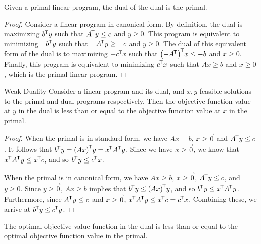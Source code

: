 \newpage

\begin{prop}
    Given a primal linear program, the dual of the dual is the primal.
\end{prop} 

\begin{proof}
    Consider a linear program in canonical form.  By definition, the dual is maximizing ${b}^{\mkern-1.5mu\mathsf{T}}y$ such that ${A}^{\mkern-1.5mu\mathsf{T}}y \leq c$ and $y \geq 0$. This program is equivalent to minimizing $-{b}^{\mkern-1.5mu\mathsf{T}}y$ such that $-{A}^{\mkern-1.5mu\mathsf{T}}y \geq -c$ and $y \geq 0$. The dual of this equivalent form of the dual is to maximizing $-{c}^{\mkern-1.5mu\mathsf{T}}x$ such that ${\left(-{A}^{\mkern-1.5mu\mathsf{T}}\right)}^{\mkern-1.5mu\mathsf{T}}x \leq -b$ and $x \geq 0$. Finally, this program is equivalent to minimizing ${c}^{\mkern-1.5mu\mathsf{T}}x$ such that $Ax \geq b$ and $x \geq 0$, which is the primal linear program.
\end{proof}

\begin{thm}{Weak Duality}\label{weak-duality}\proofbreak
    Consider a linear program and its dual, and $x, y$ feasible solutions to the primal and dual programs respectively. Then the objective function value at $y$ in the dual is less than or equal to the objective function value at $x$ in the primal.
\end{thm}

\begin{proof}
    When the primal is in standard form, we have $Ax = b$, $x \geq \vec{0}$ and ${A}^{\mkern-1.5mu\mathsf{T}}y \leq c$. It follows that ${b}^{\mkern-1.5mu\mathsf{T}}y = {(Ax)}^{\mkern-1.5mu\mathsf{T}}y = {x}^{\mkern-1.5mu\mathsf{T}}{A}^{\mkern-1.5mu\mathsf{T}}y$. Since we have $x \geq \vec{0}$, we know that ${x}^{\mkern-1.5mu\mathsf{T}}{A}^{\mkern-1.5mu\mathsf{T}}y \leq {x}^{\mkern-1.5mu\mathsf{T}}c$, and so ${b}^{\mkern-1.5mu\mathsf{T}}y \leq {c}^{\mkern-1.5mu\mathsf{T}}x$.

    When the primal is in canonical form, we have $Ax \geq b$, $x \geq \vec{0}$, ${A}^{\mkern-1.5mu\mathsf{T}}y \leq c$, and $y \geq 0$. Since $y \geq \vec{0}$, $Ax \geq b$ implies that ${b}^{\mkern-1.5mu\mathsf{T}}y \leq {(Ax)}^{\mkern-1.5mu\mathsf{T}}y$, and so ${b}^{\mkern-1.5mu\mathsf{T}}y \leq {x}^{\mkern-1.5mu\mathsf{T}}{A}^{\mkern-1.5mu\mathsf{T}}y$. Furthermore, since ${A}^{\mkern-1.5mu\mathsf{T}}y \leq c$ and $x \geq \vec{0}$, ${x}^{\mkern-1.5mu\mathsf{T}}{A}^{\mkern-1.5mu\mathsf{T}}y \leq {x}^{\mkern-1.5mu\mathsf{T}}c = {c}^{\mkern-1.5mu\mathsf{T}}x$. Combining these, we arrive at ${b}^{\mkern-1.5mu\mathsf{T}}y \leq {c}^{\mkern-1.5mu\mathsf{T}}y$.
\end{proof}

\begin{cor}
    The optimal objective value function in the dual is less than or equal to the optimal objective function value in the primal.
\end{cor}

